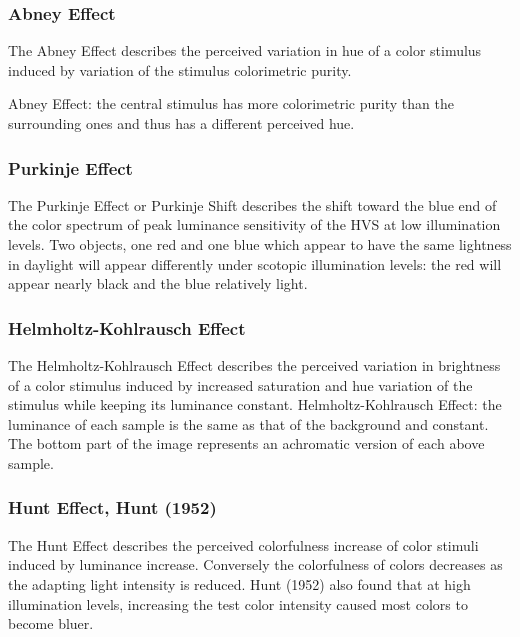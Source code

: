 \subsubsection{Abney Effect}%
\label{subsubsec:abney-effect}

The Abney Effect describes the perceived variation in hue of a color stimulus induced by variation of the stimulus colorimetric purity.

Abney Effect: the central stimulus has more colorimetric purity than the surrounding ones and thus has a different perceived hue.

\subsubsection{Purkinje Effect}%
\label{subsubsec:purkinje-effect}

The Purkinje Effect or Purkinje Shift describes the shift toward the blue end of the color spectrum of peak luminance sensitivity of the HVS at low illumination levels.
Two objects, one red and one blue which appear to have the same lightness in daylight will appear differently under scotopic illumination levels: the red will appear nearly black and the blue relatively light.

\subsubsection{Helmholtz-Kohlrausch Effect}%
\label{subsubsec:helmholtz-kohlrausch-effect}

The Helmholtz-Kohlrausch Effect describes the perceived variation in brightness of a color stimulus induced by increased saturation and hue variation of the stimulus while keeping its luminance constant.
Helmholtz-Kohlrausch Effect: the luminance of each sample is the same as that of the background and constant. The bottom part of the image represents an achromatic version of each above sample.

\subsubsection{Hunt Effect, Hunt (1952)}%
\label{subsubsec:hunt-effect-hunt-1952}

The Hunt Effect describes the perceived colorfulness increase of color stimuli induced by luminance increase. Conversely the colorfulness of colors decreases as the adapting light intensity is reduced.
Hunt (1952) also found that at high illumination levels, increasing the test color intensity caused most colors to become bluer.

